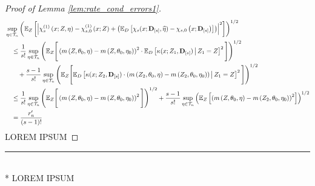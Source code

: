 \begin{proof}[Proof of Lemma \ref{lem:rate_cond_errors1}]
    \begin{equation}
        \begin{aligned}
            & \sup_{\eta \in \mathcal{T}_{n}}\left(
                \mathbb{E}_{Z}\left[
                    \left|\chi_{s}^{(1)}\left(x; Z, \eta\right) 
                    - \chi_{s,0}^{(1)}\left(x; Z\right)
                    + \left(\mathbb{E}_{D}\left[\chi_{s}(x; \mathbf{D}_{[s]}, \widehat{\eta}) - \chi_{s,0}\left(x; \mathbf{D}_{[s]}\right)\right]\right)\right|^2
                \right]
            \right)^{1 / 2} \\
            & \quad \leq
             \frac{1}{s!}\sup_{\eta \in \mathcal{T}_{n}}\left(\mathbb{E}_{Z}\Bigg[\left(m\left(Z, \theta_{0}, \eta\right) - m\left(Z, \theta_{0}, \eta_{0}\right)\right)^{2} \cdot \mathbb{E}_{D}\left[\kappa(x; Z_{1}, \mathbf{D}_{[s]}) \, \middle| \, Z_1 = Z \right]^{2}\Bigg]\right)^{1/2}\\
            & \quad \quad + \frac{s-1}{s!} \sup_{\eta \in \mathcal{T}_{n}} \left(\mathbb{E}_{Z}\Bigg[\mathbb{E}_{D}\left[\kappa(x; Z_{2}, \mathbf{D}_{[s]})\cdot \left(m\left(Z_{2}, \theta_{0}, \eta\right)
            - m\left(Z_{2}, \theta_{0}, \eta_{0}\right)\right) \, \middle| \, Z_1 = Z \right]^{2}\Bigg]\right)^{1/2} \\
            & \quad \leq 
            \frac{1}{s!}\sup_{\eta \in \mathcal{T}_{n}}\left(\mathbb{E}_{Z}\Bigg[\left(m\left(Z, \theta_{0}, \eta\right) - m\left(Z, \theta_{0}, \eta_{0}\right)\right)^{2} \Bigg]\right)^{1/2}
            + \frac{s-1}{s!} \sup_{\eta \in \mathcal{T}_{n}} \left(\mathbb{E}_{Z}\left[\left(m\left(Z, \theta_{0}, \eta\right)
            - m\left(Z_{2}, \theta_{0}, \eta_{0}\right)\right)^{2}\right]\right)^{1/2}\\
            & \quad = \frac{r_{n}^{\prime}}{(s-1)!}
        \end{aligned}
    \end{equation}
    {\color{red} LOREM IPSUM}
\end{proof}

\hrule

\begin{lem}[]\label{lem:rate_cond_errors2}\mbox{}\\*
    {\color{red} LOREM IPSUM}
\end{lem}

